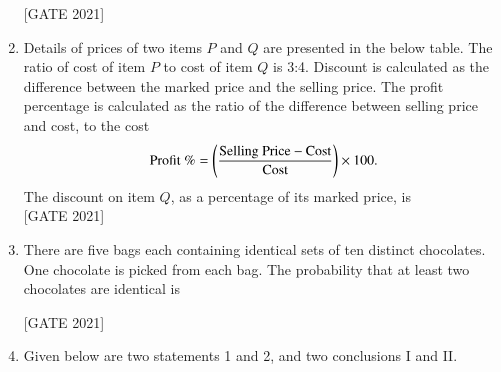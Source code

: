 \documentclass[journal,12pt,onecolumn]{IEEEtran}
\theoremstyle{remark}
\begin{document}
\begin{enumerate}
\hfill{[GATE 2021]}
\begin{enumerate}
\end{enumerate}
\item Details of prices of two items $ P $ and $ Q $ are presented in the below table. The ratio of cost of item $ P $ to cost of item $ Q $ is 3:4. Discount is calculated as the difference between the marked price and the selling price. The profit percentage is calculated as the ratio of the difference between selling price and cost, to the cost 
\begin{align*}
\text{Profit \%} = \left(\dfrac{\text{Selling Price} - \text{Cost}}{\text{Cost}}\right) \times 100.
\end{align*}
The discount on item $ Q $, as a percentage of its marked price, is \\



\hfill{[GATE 2021]}
\begin{enumerate}
\end{enumerate}

\item There are five bags each containing identical sets of ten distinct chocolates. One chocolate is picked from each bag. The probability that at least two chocolates are identical is \underline{\hspace{1.5cm}}

\hfill{[GATE 2021]}
\begin{enumerate}
\end{enumerate}     
    \item  Given below are two statements 1 and 2, and two conclusions I and II.


\end{enumerate}
\end{document}

